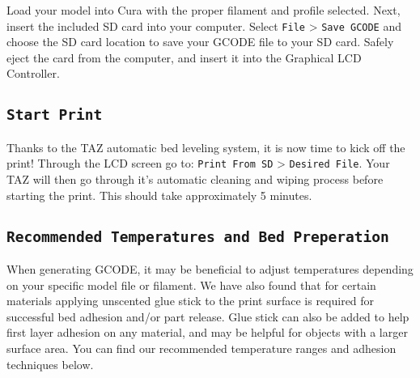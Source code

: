 Load your model into Cura with the proper filament and profile selected. Next, insert the included SD card into your computer. Select \texttt{File} > \texttt{Save GCODE} and choose the SD card location to save your GCODE file to your SD card. Safely eject the card from the computer, and insert it into the Graphical LCD Controller. 



\subsection{\texttt{Start Print}}
Thanks to the TAZ automatic bed leveling system, it is now time to kick off the print! Through the LCD screen go to: \texttt{Print From SD} > \texttt{Desired File}. Your TAZ will then go through it's automatic cleaning and wiping process before starting the print. This should take approximately 5 minutes.




\subsection{\texttt{Recommended Temperatures and Bed Preperation}}
When generating GCODE, it may be beneficial to adjust temperatures depending on your specific model file or filament. We have also found that for certain materials applying unscented glue stick to the print surface is required for successful bed adhesion and/or part release. Glue stick can also be added to help first layer adhesion on any material, and may be helpful for objects with a larger surface area. You can find our recommended temperature ranges and adhesion techniques below.


